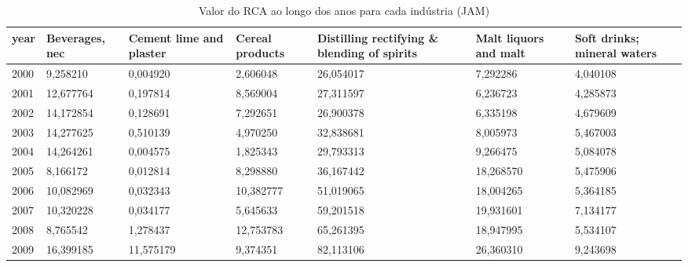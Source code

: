 \begin{table}
\centering
\caption{Valor do RCA ao longo dos anos para cada indústria (JAM)}
\begin{tabular}{p{1cm}p{2cm}p{2cm}p{2cm}p{2cm}p{2cm}p{2cm}}
\toprule
 year &  Beverages, nec &  Cement lime and plaster &  Cereal products &  Distilling rectifying \& blending of spirits &  Malt liquors and malt &  Soft drinks; mineral waters \\
\midrule
 2000 &        9,258210 &                 0,004920 &         2,606048 &                                    26,054017 &               7,292286 &                     4,040108 \\
 2001 &       12,677764 &                 0,197814 &         8,569004 &                                    27,311597 &               6,236723 &                     4,285873 \\
 2002 &       14,172854 &                 0,128691 &         7,292651 &                                    26,900378 &               6,335198 &                     4,679609 \\
 2003 &       14,277625 &                 0,510139 &         4,970250 &                                    32,838681 &               8,005973 &                     5,467003 \\
 2004 &       14,264261 &                 0,004575 &         1,825343 &                                    29,793313 &               9,266475 &                     5,084078 \\
 2005 &        8,166172 &                 0,012814 &         8,298880 &                                    36,167442 &              18,268570 &                     5,475906 \\
 2006 &       10,082969 &                 0,032343 &        10,382777 &                                    51,019065 &              18,004265 &                     5,364185 \\
 2007 &       10,320228 &                 0,034177 &         5,645633 &                                    59,201518 &              19,931601 &                     7,134177 \\
 2008 &        8,765542 &                 1,278437 &        12,753783 &                                    65,261395 &              18,947995 &                     5,534107 \\
 2009 &       16,399185 &                11,575179 &         9,374351 &                                    82,113106 &              26,360310 &                     9,243698 \\

\end{tabular}
\end{table}
